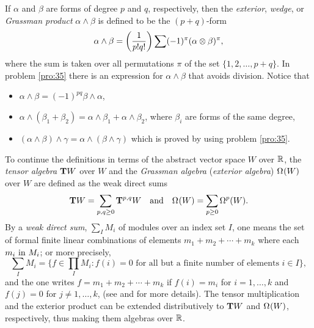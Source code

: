 \documentclass[../main]{subfiles}
\begin{document}
If $\alpha$ and $\beta$ are forms of degree $p$ and $q$, respectively, then the \emph{exterior}, \emph{wedge}, or \emph{Grassman product} $\alpha\wedge\beta$ is defined to be the $(p+q)$-form 
\[ \alpha\wedge\beta = \bigc(\frac{1}{p!q!}\bigc)\sum (-1)^\pi(\alpha\otimes\beta)^\pi, \]
where the sum is taken over all permutations $\pi$ of the set $\{1, 2,\dots,p+q\}$. In problem \ref{pro:35} there is an expression for $\alpha \wedge\beta$ that avoids division. Notice that
\begin{itemize}
    \item $\alpha\wedge\beta = (-1)^{pq}\beta\wedge\alpha$,
    \item $\alpha\wedge(\beta_1+\beta_2)=\alpha\wedge\beta_1+\alpha\wedge\beta_2$, where $\beta_i$ are forms of the same degree,
    \item $(\alpha\wedge\beta)\wedge\gamma = \alpha\wedge(\beta\wedge\gamma)$ which is proved by using problem \ref{pro:35}. 
\end{itemize}
To continue the definitions in terms of the abstract vector space $W$ over $\bR$, the \emph{tensor algebra} $\tangentbundle{W}$ over $W$ and the \emph{Grassman algebra} (\emph{exterior algebra}) $\formbundle{W}{}$ over $W$ are defined as the weak direct sums 
\[ \tangentbundle{W} = \sum_{p, q\ge 0} \tensorbundle{W}{p}{q}\hspace{1em}\text{and}\hspace{1em} \formbundle{W}{} = \sum_{p\ge 0} \formbundle{W}{p}. \]
By a \emph{weak direct sum}, $\sum_IM_i$ of modules over an index set $I$, one means the set of formal finite linear combinations of elements $m_1 + m_2 + \cdots + m_k$ where each $m_i \InText M_i$; or more precisely,
\[ \sum_{I} M_i = \big\{ f\in \prod_I M_i \colon f(i) = 0 \text{ for all but a finite number of elements } i\in I\big\}, \]
and the one writes $f=m_1 + m_2 + \cdots + m_k$ if $f(i) = m_i$ for $i=1,\dots, k$ and $f(j) = 0$ for $j\ne 1, \dots, k$, (see \cite{chevalley1956fundemental} and \cite{jacobson2013lectures} for more details). The tensor multiplication and the exterior product can be extended distributively to $\tangentbundle{W}$ and $\formbundle{W}{}$, respectively, thus making them algebras over $\bR$.
\end{document}
